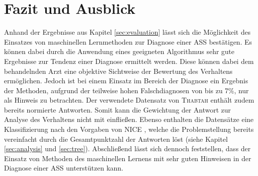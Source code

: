 \section{Fazit und Ausblick}
Anhand der Ergebnisse aus Kapitel \ref{sec:evaluation} lässt sich die Möglichkeit des Einsatzes von maschinellen Lernmethoden zur Diagnose einer ASS bestätigen. Es können dabei durch die Anwendung eines geeigneten Algorithmus sehr gute Ergebnisse zur Tendenz einer Diagnose ermittelt werden. Diese können dabei dem behandelnden Arzt eine objektive Sichtweise der Bewertung des Verhaltens ermöglichen. Jedoch ist bei einem Einsatz im Bereich der Diagnose ein Ergebnis der Methoden, aufgrund der teilweise hohen Falschdiagnosen von bis zu 7\%, nur als Hinweis zu betrachten. 
Der verwendete Datensatz von \textsc{Thabtah} \cite{Thabtah2017, Thabtah, Thabtah2018} enthält zudem bereits normierte Antworten. Somit kann die Gewichtung der Antwort zur Analyse des Verhaltens nicht mit einfließen. Ebenso enthalten die Datensätze eine Klassifizierung nach den Vorgaben von \textsc{NICE} \cite{NICE2012}, welche die Problemstellung bereits vereinfacht durch die Gesamtpunktzahl der Antworten löst (siehe Kapitel \ref{sec:analysis} und \ref{sec:tree}). Abschließend lässt sich dennoch feststellen, dass der Einsatz von Methoden des maschinellen Lernens mit sehr guten Hinweisen in der Diagnose einer ASS unterstützen kann.

